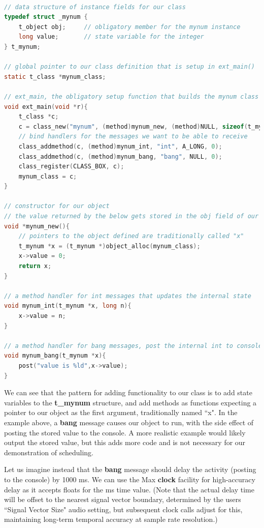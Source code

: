 \documentclass[acmsmall, anonymous, review]{acmart}
\begin{document}
\begin{lstlisting}[language=C]

// data structure of instance fields for our class
typedef struct _mynum {
    t_object obj;     // obligatory member for the mynum instance 
    long value;       // state variable for the integer
} t_mynum;

// global pointer to our class definition that is setup in ext_main()
static t_class *mynum_class; 

// ext_main, the obligatory setup function that builds the mynum class
void ext_main(void *r){
    t_class *c;
    c = class_new("mynum", (method)mynum_new, (method)NULL, sizeof(t_mynum), 0L, 0);
    // bind handlers for the messages we want to be able to receive
    class_addmethod(c, (method)mynum_int, "int", A_LONG, 0);
    class_addmethod(c, (method)mynum_bang, "bang", NULL, 0);
    class_register(CLASS_BOX, c);
    mynum_class = c;
}

// constructor for our object
// the value returned by the below gets stored in the obj field of our t_mynum struct
void *mynum_new(){
    // pointers to the object defined are traditionally called "x"
    t_mynum *x = (t_mynum *)object_alloc(mynum_class);
    x->value = 0;
    return x;
}

// a method handler for int messages that updates the internal state
void mynum_int(t_mynum *x, long n){
    x->value = n;
}

// a method handler for bang messages, post the internal int to console
void mynum_bang(t_mynum *x){
    post("value is %ld",x->value);
}

\end{lstlisting}


We can see that the pattern for adding functionality to our class is to
add state variables to the \textbf{t\_mynum} structure, and add methods as
functions expecting a pointer to our object as the first argument,
traditionally named ``x". In the example above, a \textbf{bang} message causes our
object to run, with the side effect of posting the stored value to the console. A more
realistic example would likely output the stored value, but this adds more code
and is not necessary for our demonstration of scheduling.

Let us imagine instead that the \textbf{bang} message should delay the activity
(posting to the console) by 1000 ms. We can use the Max \textbf{clock} facility for high-accuracy
delay as it accepts floats for the ms time value. (Note that the actual delay time
will be offset to the nearest signal vector boundary, determined by the
users ``Signal Vector Size" audio setting, but subsequent clock calls 
adjust for this, maintaining long-term temporal accuracy at sample rate resolution.)  
\end{document}
